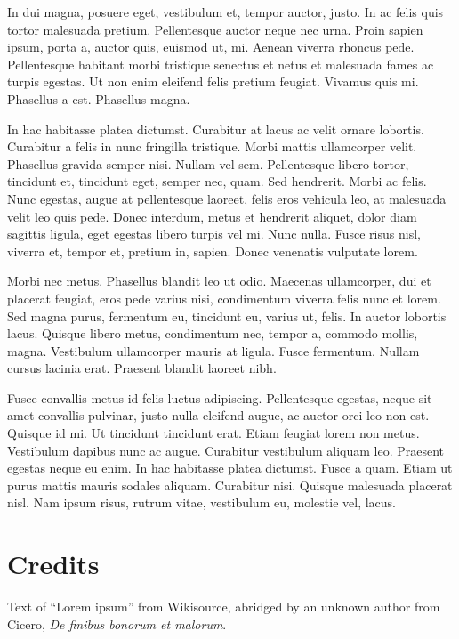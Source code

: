 \begin{multicols}{2}
In dui magna, posuere eget, vestibulum et, tempor auctor, justo. In ac
felis quis tortor malesuada pretium. Pellentesque auctor neque nec
urna. Proin sapien ipsum, porta a, auctor quis, euismod ut, mi. Aenean
viverra rhoncus pede. Pellentesque habitant morbi tristique senectus
et netus et malesuada fames ac turpis egestas. Ut non enim eleifend
felis pretium feugiat. Vivamus quis mi. Phasellus a est. Phasellus
magna.

In hac habitasse platea dictumst. Curabitur at lacus ac velit ornare
lobortis. Curabitur a felis in nunc fringilla tristique. Morbi mattis
ullamcorper velit. Phasellus gravida semper nisi. Nullam vel sem.
Pellentesque libero tortor, tincidunt et, tincidunt eget, semper nec,
quam. Sed hendrerit. Morbi ac felis. Nunc egestas, augue at
pellentesque laoreet, felis eros vehicula leo, at malesuada velit leo
quis pede. Donec interdum, metus et hendrerit aliquet, dolor diam
sagittis ligula, eget egestas libero turpis vel mi. Nunc nulla. Fusce
risus nisl, viverra et, tempor et, pretium in, sapien. Donec venenatis
vulputate lorem.

Morbi nec metus. Phasellus blandit leo ut odio. Maecenas ullamcorper,
dui et placerat feugiat, eros pede varius nisi, condimentum viverra
felis nunc et lorem. Sed magna purus, fermentum eu, tincidunt eu,
varius ut, felis. In auctor lobortis lacus. Quisque libero metus,
condimentum nec, tempor a, commodo mollis, magna. Vestibulum
ullamcorper mauris at ligula. Fusce fermentum. Nullam cursus lacinia
erat. Praesent blandit laoreet nibh.

Fusce convallis metus id felis luctus adipiscing. Pellentesque
egestas, neque sit amet convallis pulvinar, justo nulla eleifend
augue, ac auctor orci leo non est. Quisque id mi. Ut tincidunt
tincidunt erat. Etiam feugiat lorem non metus. Vestibulum dapibus nunc
ac augue. Curabitur vestibulum aliquam leo. Praesent egestas neque eu
enim. In hac habitasse platea dictumst. Fusce a quam. Etiam ut purus
mattis mauris sodales aliquam. Curabitur nisi. Quisque malesuada
placerat nisl. Nam ipsum risus, rutrum vitae, vestibulum eu, molestie
vel, lacus.

\end{multicols}

\section*{Credits}

Text of ``Lorem ipsum'' from Wikisource, abridged by an unknown author
from Cicero, \emph{De finibus bonorum et malorum}.

